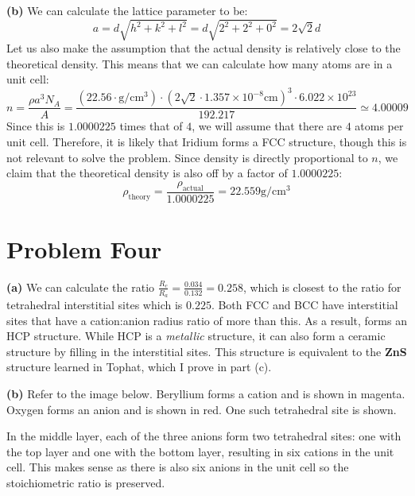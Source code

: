 \documentclass{article}
\begin{document}
    \textbf{(b)} We can calculate the lattice parameter to be:
    \begin{equation}
        a = d\sqrt{h^2+k^2+l^2}=d\sqrt{2^2+2^2+0^2}=2\sqrt{2}d
    \end{equation}
    Let us also make the assumption that the actual density is relatively close to the theoretical density. This means that we can calculate how many atoms are in a unit cell:
    \begin{equation}
        n = \frac{\rho a^3 N_A}{A} = \frac{(22.56 \cdot \si{\gram\per\centi\meter\cubed}) \cdot (2\sqrt{2} \cdot 1.357 \times 10^{-8} \si{\centi\meter})^3 \cdot 6.022 \times 10^{23}}{192.217} \simeq 4.00009
    \end{equation}
    Since this is $1.0000225$ times that of $4$, we will assume that there are $4$ atoms per unit cell. Therefore, it is likely that Iridium forms a FCC structure, though this is not relevant to solve the problem. Since density is directly proportional to $n$, we claim that the theoretical density is also off by a factor of $1.0000225$:
    \begin{equation}
        \rho_\text{theory} = \frac{\rho_\text{actual}}{1.0000225} = 22.559 \si{\gram\per\centi\meter\cubed}
    \end{equation}
    \section*{Problem Four}
    \textbf{(a)} We can calculate the ratio $\frac{R_c}{R_a}=\frac{0.034}{0.132}=0.258$, which is closest to the ratio for tetrahedral interstitial sites which is $0.225$. Both FCC and BCC have interstitial sites that have a cation:anion radius ratio of more than this. As a result,  forms an HCP structure. While HCP is a \textit{metallic} structure, it can also form a ceramic structure by filling in the interstitial sites. This structure is equivalent to the \textbf{ZnS} structure learned in Tophat, which I prove in part (c). 

    \textbf{(b)} Refer to the image below. Beryllium forms a cation and is shown in magenta. Oxygen forms an anion and is shown in red. One such tetrahedral site is shown.
    \begin{figure}[ht]
        \centering
    \end{figure}
    In the middle layer, each of the three anions form two tetrahedral sites: one with the top layer and one with the bottom layer, resulting in six cations in the unit cell. This makes sense as there is also six anions in the unit cell so the stoichiometric ratio is preserved.
\end{document}
